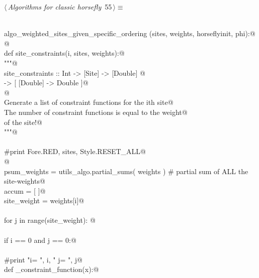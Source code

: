 \documentclass[11.5pt]{report}
\begin{document}
\vspace{-0.8cm} \newchunk
\begin{flushleft} \small\label{scrap78}\raggedright\small
{} $\langle\,${\itshape Algorithms for classic horsefly}\nobreak\ {\footnotesize {55}}$\,\rangle\equiv$
\vspace{-1ex}
\begin{list}{}{} \item
\mbox{}\verb@@\\
\mbox{}\verb@def algo_weighted_sites_given_specific_ordering (sites, weights, horseflyinit, phi):@\\
\mbox{}\verb@      @\\
\mbox{}\verb@     def site_constraints(i, sites, weights):@\\
\mbox{}\verb@          """@\\
\mbox{}\verb@          site_constraints :: Int -> [Site] -> [Double] @\\
\mbox{}\verb@                          -> [ [Double] -> Double  ]@\\
\mbox{}\verb@          @\\
\mbox{}\verb@          Generate a list of constraint functions for the ith site@\\
\mbox{}\verb@          The number of constraint functions is equal to the weight@\\
\mbox{}\verb@          of the site!@\\
\mbox{}\verb@          """@\\
\mbox{}\verb@@\\
\mbox{}\verb@          #print Fore.RED, sites, Style.RESET_ALL@\\
\mbox{}\verb@         @\\
\mbox{}\verb@          psum_weights = utils_algo.partial_sums( weights ) # partial sum of ALL the site-weights@\\
\mbox{}\verb@          accum        = [ ]@\\
\mbox{}\verb@          site_weight  = weights[i]@\\
\mbox{}\verb@@\\
\mbox{}\verb@          for j in range(site_weight): @\\
\mbox{}\verb@@\\
\mbox{}\verb@              if i == 0 and j == 0:@\\
\mbox{}\verb@@\\
\mbox{}\verb@                    #print "i= ", i, " j= ", j@\\
\mbox{}\verb@                    def _constraint_function(x):@\\

\end{list}
\end{flushleft}
\end{document}
